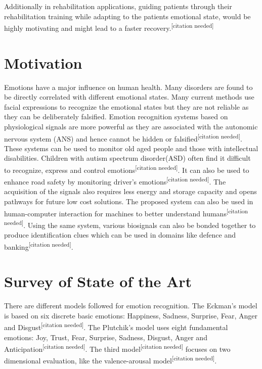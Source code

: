 \documentclass[11pt]{article}
\theoremstyle{definition}
\begin{document}
    Additionally in rehabilitation applications, guiding patients through their rehabilitation training while adapting to the patients emotional state, would be highly motivating and might lead to a faster recovery.\textsuperscript{[citation needed]}

  \section{Motivation}

Emotions have a major influence on human health. Many disorders are found to be directly correlated with different emotional states.  Many current methods use facial expressions to recognize the emotional states but they are not reliable as they can be deliberately falsified. Emotion recognition systems based on physiological signals are more powerful as they are associated with the autonomic nervous system (ANS) and hence cannot be hidden or falsified\textsuperscript{[citation needed]}. These systems can be used to monitor old aged people and those with intellectual disabilities. Children with autism spectrum disorder(ASD) often find it difficult to recognize, express and control emotions\textsuperscript{[citation needed]}. It can also be used to enhance road safety by monitoring driver's emotions\textsuperscript{[citation needed]}. The acquisition of the signals also requires less energy and storage capacity and opens pathways for future low cost solutions. The proposed system can also be used in human-computer interaction for machines to better understand humans\textsuperscript{[citation needed]}. Using the same system, various biosignals can also be bonded together to produce identification clues which can be used in domains like defence and banking\textsuperscript{[citation needed]}.\\


  \section{Survey of State of the Art}

There are different models followed for emotion recognition. The Eckman's model is based on six discrete basic emotions: Happiness, Sadness, Surprise, Fear, Anger and Disgust\textsuperscript{[citation needed]}. The Plutchik's model uses eight fundamental emotions: Joy, Trust, Fear, Surprise, Sadness, Disgust, Anger and Anticipation\textsuperscript{[citation needed]}. The third model\textsuperscript{[citation needed]} focuses on two dimensional evaluation, like the valence-arousal model\textsuperscript{[citation needed]}.\\
\end{document}
